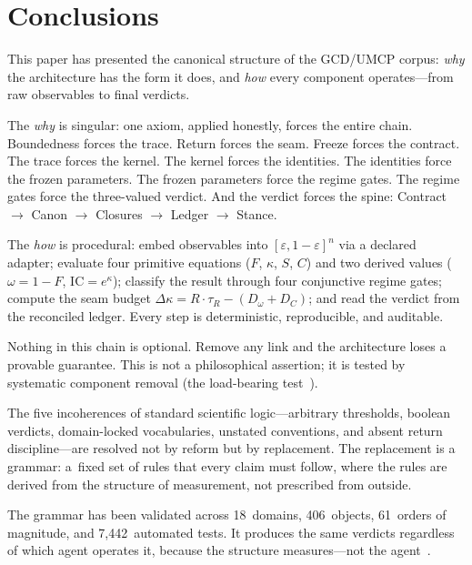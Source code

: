 \documentclass[
  aps,
  prd,
  twocolumn,
  superscriptaddress,
  nofootinbib,
  floatfix
]{revtex4-2}
\newcommand{\tR}{\tau_{\!R}}
\newcommand{\eps}{\varepsilon}
\newcommand{\IC}{\mathrm{IC}}
\begin{document}
\section{Conclusions}
\label{sec:conclusions}

This paper has presented the canonical structure of the GCD/UMCP
corpus: \emph{why} the architecture has the form it does, and
\emph{how} every component operates---from raw observables to
final verdicts.

The \emph{why} is singular: one axiom, applied honestly, forces
the entire chain.  Boundedness forces the trace.  Return forces
the seam.  Freeze forces the contract.  The trace forces the
kernel.  The kernel forces the identities.  The identities force
the frozen parameters.  The frozen parameters force the regime
gates.  The regime gates force the three-valued verdict.  And
the verdict forces the spine:
Contract $\to$ Canon $\to$ Closures $\to$ Ledger $\to$ Stance.

The \emph{how} is procedural: embed observables into
$[\eps, 1{-}\eps]^n$ via a declared adapter; evaluate
four primitive equations ($F$, $\kappa$, $S$, $C$) and two
derived values ($\omega = 1 - F$, $\IC = e^\kappa$); classify
the result through four conjunctive regime gates; compute the
seam budget $\Delta\kappa = R \cdot \tR - (D_\omega + D_C)$;
and read the verdict from the reconciled ledger.  Every
step is deterministic, reproducible, and auditable.

Nothing in this chain is optional.  Remove any link and the
architecture loses a provable guarantee.  This is not a
philosophical assertion; it is tested by systematic component
removal (the load-bearing test~\cite{umcpmetadatarepo}).

The five incoherences of standard scientific
logic---arbitrary thresholds, boolean verdicts, domain-locked
vocabularies, unstated conventions, and absent return
discipline---are resolved not by reform but by replacement.
The replacement is a grammar: a~fixed set of rules that
every claim must follow, where the rules are derived from
the structure of measurement, not prescribed from outside.

The grammar has been validated across 18~domains, 406~objects,
61~orders of magnitude, and 7{,}442~automated tests.  It produces
the same verdicts regardless of which agent operates it, because
the structure measures---not the agent~\cite{paulus2025umcp}.
\end{document}
